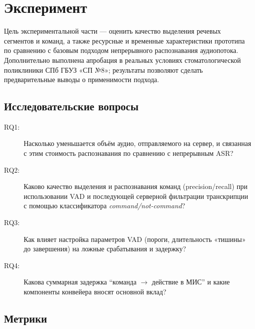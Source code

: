 
\clearpage
\section{Эксперимент}
\label{sec:experiment}

Цель экспериментальной части --- оценить качество выделения речевых сегментов и команд, а также ресурсные и временные характеристики прототипа по сравнению с базовым подходом непрерывного распознавания аудиопотока.
Дополнительно выполнена апробация в реальных условиях стоматологической поликлиники СПб ГБУЗ «СП №8»; результаты позволяют сделать предварительные выводы о применимости подхода.

\subsection{Исследовательские вопросы}
\label{subsec:exp_rq}

\begin{description}
    \item[RQ1:] Насколько уменьшается объём аудио, отправляемого на сервер, и связанная с этим стоимость распознавания по сравнению с непрерывным ASR?
    \item[RQ2:] Каково качество выделения и распознавания команд (precision/recall) при использовании VAD и последующей серверной фильтрации транскрипции с помощью классификатора \textit{command/not-command}?
    \item[RQ3:] Как влияет настройка параметров VAD (пороги, длительность «тишины» до завершения) на ложные срабатывания и задержку?
    \item[RQ4:] Какова суммарная задержка \enquote{команда $\rightarrow$ действие в МИС} и какие компоненты конвейера вносят основной вклад?
\end{description}

\subsection{Метрики}
\label{subsec:exp_metrics}

